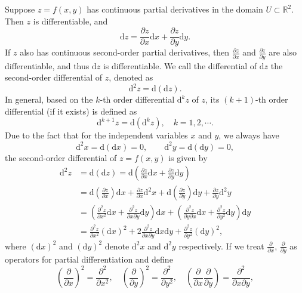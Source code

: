 \documentclass[11pt]{elegantbook}
\begin{document}
Suppose \(z=f(x,y)\) has continuous partial derivatives in the domain \(U\subset \mathbb{R}^2\). 
Then \(z\) is differentiable, and
\[
    \mathrm{d}z = \frac{\partial z}{\partial x} \mathrm{d}x + \frac{\partial z}{\partial y} \mathrm{d}y.
\]
If \(z\) also has continuous second-order partial derivatives, 
then \(\frac{\partial z}{\partial x}\) and \(\frac{\partial z}{\partial y}\) are also differentiable, 
and thus \(\mathrm{d}z\) is differentiable. 
We call the differential of \(\mathrm{d}z\) the second-order differential of \(z\), denoted as
\[
    \mathrm{d}^2z = \mathrm{d}(\mathrm{d}z).
\]
In general, based on the \(k\)-th order differential \(\mathrm{d}^kz\) of \(z\), 
its \((k+1)\)-th order differential (if it exists) is defined as
\[
    \mathrm{d}^{k+1}z = \mathrm{d}(\mathrm{d}^kz), \quad k = 1, 2, \cdots .
\]
Due to the fact that for the independent variables \( x \) and \( y \), we always have
\[
    \mathrm{d}^2 x = \mathrm{d}(\mathrm{d}x) = 0, \qquad \mathrm{d}^2 y = \mathrm{d}(\mathrm{d}y) = 0,
\]
the second-order differential of \( z = f(x, y) \) is given by
\begin{align*}
    \mathrm{d}^2 z &= \mathrm{d}(\mathrm{d}z) 
        = \mathrm{d}\left( \frac{\partial z}{\partial x} \mathrm{d}x + \frac{\partial z}{\partial y} \mathrm{d}y \right) \\
    &= \mathrm{d}\left( \frac{\partial z}{\partial x} \right) \mathrm{d}x + \frac{\partial z}{\partial x} \mathrm{d}^2 x 
        + \mathrm{d}\left( \frac{\partial z}{\partial y} \right) \mathrm{d}y + \frac{\partial z}{\partial y} \mathrm{d}^2 y\\
    &= \left( \frac{\partial^2 z}{\partial x^2} \mathrm{d}x + \frac{\partial^2 z}{\partial x \partial y} \mathrm{d}y \right) \mathrm{d}x
        + \left( \frac{\partial^2 z}{\partial y \partial x} \mathrm{d}x + \frac{\partial^2 z}{\partial y^2} \mathrm{d}y \right) \mathrm{d}y\\
    &= \frac{\partial^2 z}{\partial x^2} (\mathrm{d}x)^2 + 2 \frac{\partial^2 z}{\partial x \partial y} \mathrm{d}x \mathrm{d}y + \frac{\partial^2 z}{\partial y^2} (\mathrm{d}y)^2,
\end{align*}
where \( (\mathrm{d}x)^2 \) and \( (\mathrm{d}y)^2 \) denote \( \mathrm{d}^2 x \) and \( \mathrm{d}^2 y \) respectively.
If we treat \( \frac{\partial}{\partial x} \), \( \frac{\partial}{\partial y} \) as operators for partial differentiation 
and define
\[
    \left( \frac{\partial}{\partial x} \right)^2 = \frac{\partial^2}{\partial x^2}, \quad
    \left( \frac{\partial}{\partial y} \right)^2 = \frac{\partial^2}{\partial y^2}, \quad
    \left( \frac{\partial}{\partial x} \frac{\partial}{\partial y} \right) = \frac{\partial^2}{\partial x \partial y},
\]
\end{document}
